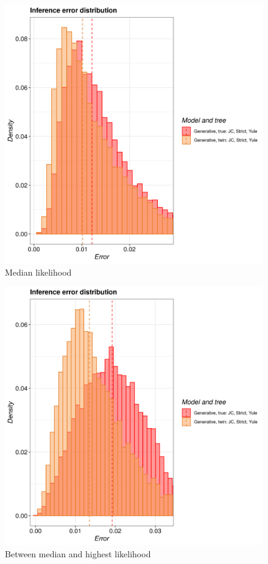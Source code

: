 \begin{figure}[H]
  \includegraphics[width=\textwidth]{pirouette_example_23/example_23_316/errors.png}
  \caption{Median likelihood}
\end{figure}


\begin{figure}[H]
  \includegraphics[width=\textwidth]{pirouette_example_23/example_23_317/errors.png}
  \caption{Between median and highest likelihood}
\end{figure}

